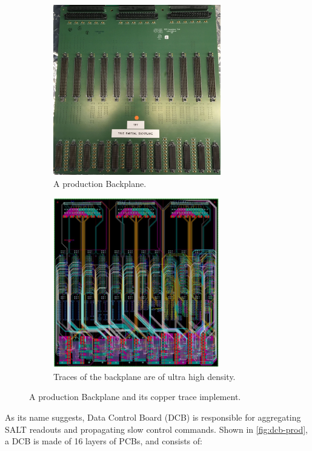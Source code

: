 \begin{figure}[!htb]
    \centering
    \begin{subfigure}[t]{0.48\textwidth}
        \centering
        \includegraphics[height=20em]{./figs-ut-upgrade/backplane/backplane_compressed.jpg}
        \caption{
            A production Backplane.
        }
    \end{subfigure}
    \hspace{10pt}
    \begin{subfigure}[t]{0.48\textwidth}
        \centering
        \includegraphics[height=20em]{./figs-ut-upgrade/backplane/backplane_trace.pdf}
        \caption{
            Traces of the backplane are of ultra high density.
        }
    \end{subfigure}

    \caption{
        A production Backplane and its copper trace implement.
    }
    \label{fig:backplane}
\end{figure}

As its name suggests, Data Control Board (DCB) is responsible for aggregating
SALT readouts and propagating slow control commands.
Shown in \cref{fig:dcb-prod}, a DCB is made of 16 layers of PCBs,
and consists of:
\label{dcb-layout}

